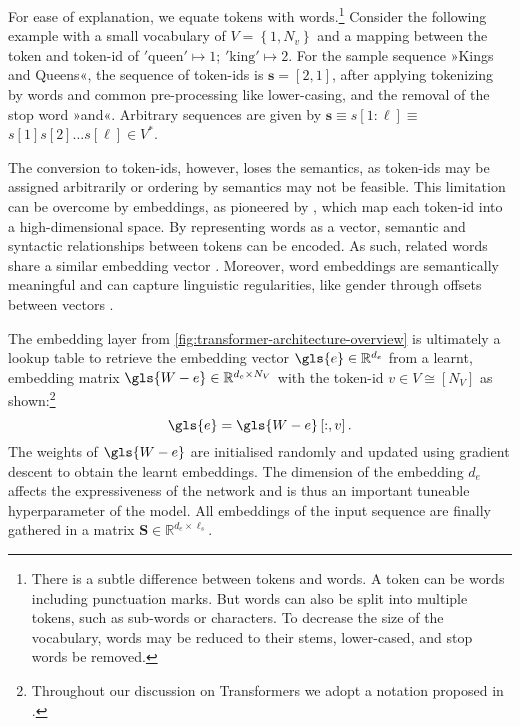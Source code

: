 For ease of explanation, we equate \glspl{token} with words.\footnote{There is a subtle difference between \glspl{token} and words. A \gls{token} can be words including punctuation marks. But words can also be split into multiple \glspl{token}, such as sub-words \autocite[][3]{bojanowskiEnrichingWordVectors2017} or characters. To decrease the size of the vocabulary, words may be reduced to their stems, lower-cased, and stop words be removed.} Consider the following example with a small vocabulary of $V=\left\{1, N_v\right\}$ and a mapping between the \gls{token} and token-id of $\mathrm{'queen'}\mapsto 1$; $\mathrm{'king'}\mapsto 2$. For the sample sequence »Kings and Queens«, the sequence of token-ids is $\mathbf{s}=[2, 1]$, after applying tokenizing by words and common pre-processing like lower-casing, and the removal of the stop word »and«. Arbitrary sequences are given by $\mathbf{s} \equiv s[1: \ell] \equiv$ $s[1] s[2] \ldots s[\ell] \in V^*$.

The conversion to token-ids, however, loses the semantics, as token-ids may be assigned arbitrarily or ordering by semantics may not be feasible. This limitation can be overcome by embeddings, as pioneered by \textcite[][1139]{bengioNeuralProbabilisticLanguage}, which map each token-id into a high-dimensional space. By representing words as a vector, semantic and syntactic relationships between tokens can be encoded. As such, related words share a similar embedding vector \autocite[][1139]{bengioNeuralProbabilisticLanguage}. Moreover, word embeddings are semantically meaningful and can capture linguistic regularities, like gender through offsets between vectors \autocite[][748--749]{mikolovLinguisticRegularitiesContinuous2013}.

The embedding layer from \cref{fig:transformer-architecture-overview} is ultimately a lookup table to retrieve the embedding vector $\gls{e} \in \mathbb{R}^{d_{e}}$ from a learnt, embedding matrix $\gls{W-e} \in \mathbb{R}^{d_{e} \times N_{V}}$ with the token-id $v \in V \cong\left[N_{V}\right]$ as shown:\footnote{Throughout our discussion on Transformers we adopt a notation proposed in \textcite[][1--16]{phuongFormalAlgorithmsTransformers2022}.}
\begin{equation}
    \gls{e}=\gls{W-e}\left[:, v\right].
    \label{eq:word-embeddings}
\end{equation}
The weights of $\gls{W-e}$ are initialised randomly and updated using gradient descent to obtain the learnt embeddings. The dimension of the embedding $d_e$ affects the expressiveness of the network and is thus an important tuneable hyperparameter of the model. All embeddings of the input sequence are finally gathered in a matrix $\mathbf{S} \in \mathbb{R}^{d_e \times \ell_s}$.

